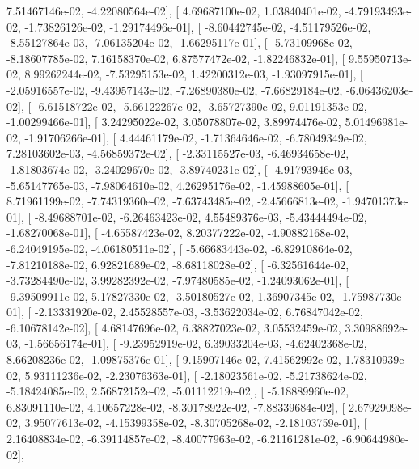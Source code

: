 \documentclass{article}
\begin{document}
          7.51467146e-02,  -4.22080564e-02],
       [  4.69687100e-02,   1.03840401e-02,  -4.79193493e-02,
         -1.73826126e-02,  -1.29174496e-01],
       [ -8.60442745e-02,  -4.51179526e-02,  -8.55127864e-03,
         -7.06135204e-02,  -1.66295117e-01],
       [ -5.73109968e-02,  -8.18607785e-02,   7.16158370e-02,
          6.87577472e-02,  -1.82246832e-01],
       [  9.55950713e-02,   8.99262244e-02,  -7.53295153e-02,
          1.42200312e-03,  -1.93097915e-01],
       [ -2.05916557e-02,  -9.43957143e-02,  -7.26890380e-02,
         -7.66829184e-02,  -6.06436203e-02],
       [ -6.61518722e-02,  -5.66122267e-02,  -3.65727390e-02,
          9.01191353e-02,  -1.00299466e-01],
       [  3.24295022e-02,   3.05078807e-02,   3.89974476e-02,
          5.01496981e-02,  -1.91706266e-01],
       [  4.44461179e-02,  -1.71364646e-02,  -6.78049349e-02,
          7.28103602e-03,  -4.56859372e-02],
       [ -2.33115527e-03,  -6.46934658e-02,  -1.81803674e-02,
         -3.24029670e-02,  -3.89740231e-02],
       [ -4.91793946e-03,  -5.65147765e-03,  -7.98064610e-02,
          4.26295176e-02,  -1.45988605e-01],
       [  8.71961199e-02,  -7.74319360e-02,  -7.63743485e-02,
         -2.45666813e-02,  -1.94701373e-01],
       [ -8.49688701e-02,  -6.26463423e-02,   4.55489376e-03,
         -5.43444494e-02,  -1.68270068e-01],
       [ -4.65587423e-02,   8.20377222e-02,  -4.90882168e-02,
         -6.24049195e-02,  -4.06180511e-02],
       [ -5.66683443e-02,  -6.82910864e-02,  -7.81210188e-02,
          6.92821689e-02,  -8.68118028e-02],
       [ -6.32561644e-02,  -3.73284490e-02,   3.99282392e-02,
         -7.97480585e-02,  -1.24093062e-01],
       [ -9.39509911e-02,   5.17827330e-02,  -3.50180527e-02,
          1.36907345e-02,  -1.75987730e-01],
       [ -2.13331920e-02,   2.45528557e-03,  -3.53622034e-02,
          6.76847042e-02,  -6.10678142e-02],
       [  4.68147696e-02,   6.38827023e-02,   3.05532459e-02,
          3.30988692e-03,  -1.56656174e-01],
       [ -9.23952919e-02,   6.39033204e-03,  -4.62402368e-02,
          8.66208236e-02,  -1.09875376e-01],
       [  9.15907146e-02,   7.41562992e-02,   1.78310939e-02,
          5.93111236e-02,  -2.23076363e-01],
       [ -2.18023561e-02,  -5.21738624e-02,  -5.18424085e-02,
          2.56872152e-02,  -5.01112219e-02],
       [ -5.18889960e-02,   6.83091110e-02,   4.10657228e-02,
         -8.30178922e-02,  -7.88339684e-02],
       [  2.67929098e-02,   3.95077613e-02,  -4.15399358e-02,
         -8.30705268e-02,  -2.18103759e-01],
       [  2.16408834e-02,  -6.39114857e-02,  -8.40077963e-02,
         -6.21161281e-02,  -6.90644980e-02],
\end{document}
